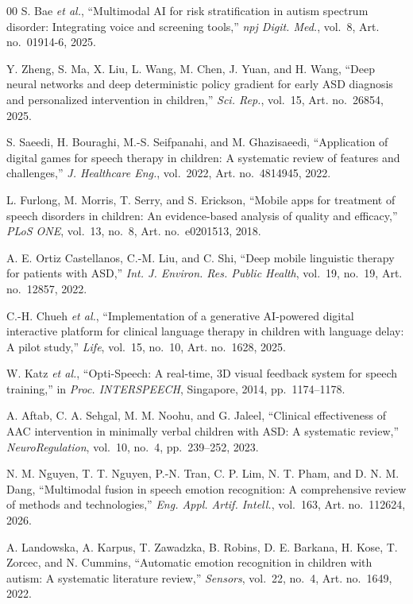 \documentclass[conference]{IEEEtran}
\begin{document}
\begin{thebibliography}{00}
 S. Bae \textit{et al.}, ``Multimodal AI for risk stratification in autism spectrum disorder: Integrating voice and screening tools,'' \textit{npj Digit. Med.}, vol.~8, Art. no.~01914-6, 2025.

 Y. Zheng, S. Ma, X. Liu, L. Wang, M. Chen, J. Yuan, and H. Wang, ``Deep neural networks and deep deterministic policy gradient for early ASD diagnosis and personalized intervention in children,'' \textit{Sci. Rep.}, vol.~15, Art. no.~26854, 2025.

 S. Saeedi, H. Bouraghi, M.-S. Seifpanahi, and M. Ghazisaeedi, ``Application of digital games for speech therapy in children: A systematic review of features and challenges,'' \textit{J. Healthcare Eng.}, vol.~2022, Art. no.~4814945, 2022.

 L. Furlong, M. Morris, T. Serry, and S. Erickson, ``Mobile apps for treatment of speech disorders in children: An evidence-based analysis of quality and efficacy,'' \textit{PLoS ONE}, vol.~13, no.~8, Art. no.~e0201513, 2018.

 A. E. Ortiz Castellanos, C.-M. Liu, and C. Shi, ``Deep mobile linguistic therapy for patients with ASD,'' \textit{Int. J. Environ. Res. Public Health}, vol.~19, no.~19, Art. no.~12857, 2022.

 C.-H. Chueh \textit{et al.}, ``Implementation of a generative AI-powered digital interactive platform for clinical language therapy in children with language delay: A pilot study,'' \textit{Life}, vol.~15, no.~10, Art. no.~1628, 2025.

 W. Katz \textit{et al.}, ``Opti-Speech: A real-time, 3D visual feedback system for speech training,'' in \textit{Proc. INTERSPEECH}, Singapore, 2014, pp.~1174--1178.

 A. Aftab, C. A. Sehgal, M. M. Noohu, and G. Jaleel, ``Clinical effectiveness of AAC intervention in minimally verbal children with ASD: A systematic review,'' \textit{NeuroRegulation}, vol.~10, no.~4, pp.~239--252, 2023.

 N. M. Nguyen, T. T. Nguyen, P.-N. Tran, C. P. Lim, N. T. Pham, and D. N. M. Dang, ``Multimodal fusion in speech emotion recognition: A comprehensive review of methods and technologies,'' \textit{Eng. Appl. Artif. Intell.}, vol.~163, Art. no.~112624, 2026.

 A. Landowska, A. Karpus, T. Zawadzka, B. Robins, D. E. Barkana, H. Kose, T. Zorcec, and N. Cummins, ``Automatic emotion recognition in children with autism: A systematic literature review,'' \textit{Sensors}, vol.~22, no.~4, Art. no.~1649, 2022.


\end{thebibliography}
\end{document}
